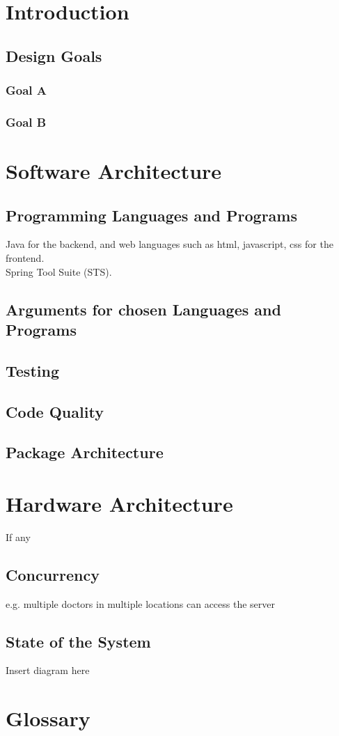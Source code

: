 \documentclass[a4paper]{article}
\begin{document}
	
	
	\tableofcontents
	\clearpage
	
	\section{Introduction}
		\subsection{Design Goals}
		\subsubsection{Goal A}
		\subsubsection{Goal B}
	
	\section{Software Architecture}
		\subsection{Programming Languages and Programs}
			Java for the backend, and web languages such as html, javascript, css for the frontend.\\
			Spring Tool Suite (STS).
		\subsection{Arguments for chosen Languages and Programs}
		\subsection{Testing}
		\subsection{Code Quality}
		\subsection{Package Architecture}
	
	\section{Hardware Architecture}
		If any
		\subsection{Concurrency}
			e.g. multiple doctors in multiple locations can access the server
		\subsection{State of the System}
			Insert diagram here
		
	\section{Glossary}
\end{document}
